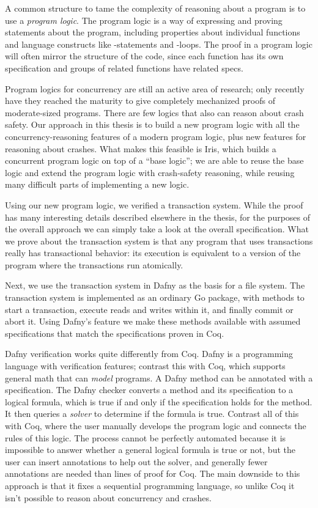 A common structure to tame the complexity of reasoning about a program is to use
a \emph{program logic}. The program logic is a way of expressing and proving
statements about the program, including properties about individual functions
and language constructs like -statements and -loops. The proof
in a program logic will often mirror the structure of the code, since each
function has its own specification and groups of related functions have related
specs.

Program logics for concurrency are still an active area of research; only
recently have they reached the maturity to give completely mechanized proofs of
moderate-sized programs. There are few logics that also can reason about crash
safety. Our approach in this thesis is to build a new program logic with all the
concurrency-reasoning features of a modern program logic, plus new features for
reasoning about crashes. What makes this feasible is Iris, which builds a
concurrent program logic on top of a ``base logic''; we are able to reuse the
base logic and extend the program logic with crash-safety reasoning, while
reusing many difficult parts of implementing a new logic.

Using our new program logic, we verified a transaction system. While the proof
has many interesting details described elsewhere in the thesis, for the purposes
of the overall approach we can simply take a look at the overall specification.
What we prove about the transaction system is that any program that uses
transactions really has transactional behavior: its execution is equivalent to a
version of the program where the transactions run atomically.

Next, we use the transaction system in Dafny as the basis for a file system.
The transaction system is implemented as an ordinary Go package, with methods to
start a transaction, execute reads and writes within it, and finally commit or
abort it. Using Dafny's  feature we make these methods available with
assumed specifications that match the specifications proven in Coq.

Dafny verification works quite differently from Coq. Dafny is a programming
language with verification features; contrast this with Coq, which supports
general math that can \emph{model} programs. A Dafny method can be annotated
with a specification. The Dafny checker converts a method and its specification
to a logical formula, which is true if and only if the specification holds for
the method. It then queries a \emph{solver} to determine if the formula is true.
Contrast all of this with Coq, where the user manually develops the program
logic and connects the rules of this logic. The process cannot be perfectly
automated because it is impossible to answer whether a general logical formula
is true or not, but the user can insert annotations to help out the solver, and
generally fewer annotations are needed than lines of proof for Coq. The main
downside to this approach is that it fixes a sequential programming language, so
unlike Coq it isn't possible to reason about concurrency and crashes.


